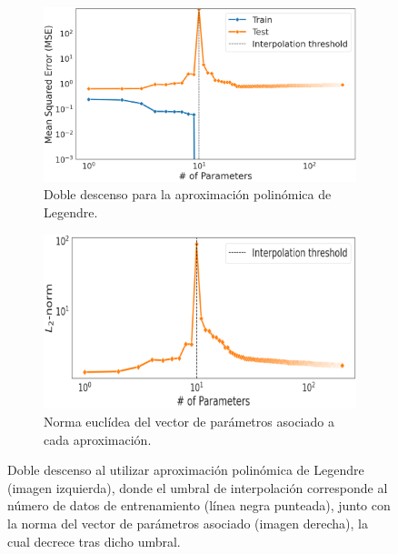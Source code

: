 \begin{figure}[h]
    \centering
    \begin{subfigure}[b]{0.48\textwidth}
        \centering
        \includegraphics[width=\textwidth]{img/experiments/legendre1DDD.png}
        \caption{Doble descenso para la aproximación polinómica de Legendre.}\label{fig:legendre1.1DDD}
    \end{subfigure}
    \hfill
    \begin{subfigure}[b]{0.48\textwidth}
        \centering
        \includegraphics[width=\textwidth]{img/experiments/legendre1.4.png}
        \caption{Norma euclídea del vector de parámetros asociado a cada aproximación.}\label{fig:legendre1.2DDD}
    \end{subfigure}
    \caption[Doble descenso al utilizar aproximación polinómica de Legendre y norma del vector de parámetros.]{Doble descenso al utilizar aproximación polinómica de Legendre (imagen izquierda), donde el umbral de interpolación corresponde al número de datos de entrenamiento (línea negra punteada), junto con la norma del vector de parámetros asociado (imagen derecha), la cual decrece tras dicho umbral.}\label{fig:legendre1DDD}
\end{figure}

